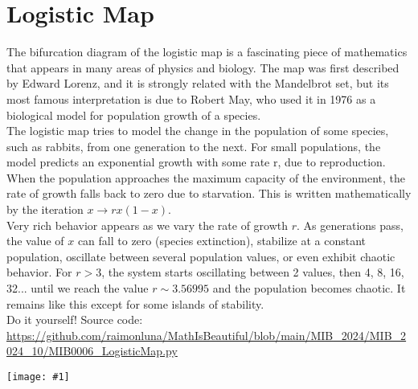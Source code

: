\documentclass[12pt,landscape]{article}
\newcommand{\artpage}[3][]{%
  \begin{minipage}[t]{0.48\linewidth}
    \vspace{0pt} %
    \section*{#2} %
    \addcontentsline{toc}{section}{#2} %
    #3 %
  \end{minipage}%
  \hfill
  \begin{minipage}[t]{0.48\linewidth}
    \vspace{0pt} %
    \centering
    \texttt{[image: \#1]}
  \end{minipage}%
  \newpage
}
\begin{document}
\artpage[../Output/LowQuality/MIB0006_LogisticMap.png]{Logistic Map}{%
The bifurcation diagram of the logistic map is a fascinating piece of mathematics that appears in many areas of physics and biology. The map was first described by Edward Lorenz, and it is strongly related with the Mandelbrot set, but its most famous interpretation is due to Robert May, who used it in 1976 as a biological model for population growth of a species.\\

The logistic map tries to model the change in the population of some species, such as rabbits, from one generation to the next. For small populations, the model predicts an exponential growth with some rate r, due to reproduction. When the population approaches the maximum capacity of the environment, the rate of growth falls back to zero due to starvation. This is written mathematically by the iteration $x \to r x (1 - x)$.\\

Very rich behavior appears as we vary the rate of growth $r$. As generations pass, the value of $x$ can fall to zero (species extinction), stabilize at a constant population, oscillate between several population values, or even exhibit chaotic behavior. For $r > 3$, the system starts oscillating between 2 values, then 4, 8, 16, 32... until we reach the value $r \sim 3.56995$ and the population becomes chaotic. It remains like this except for some islands of stability.\\

Do it yourself! Source code: \url{https://github.com/raimonluna/MathIsBeautiful/blob/main/MIB_2024/MIB_2024_10/MIB0006_LogisticMap.py}
}
\end{document}
